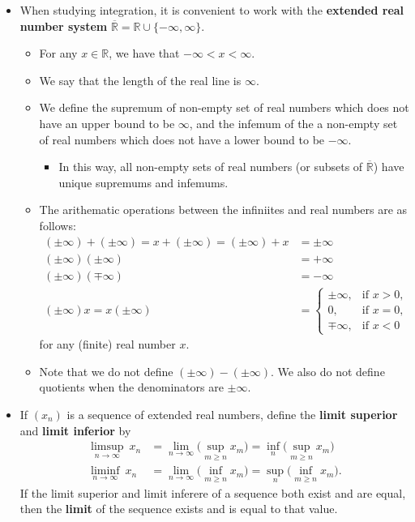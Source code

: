 \documentclass[10pt]{article}
\newcommand{\Real}{\mathbb{R}}
\begin{document}
\begin{itemize}
  \item When studying integration, it is convenient to work with the {\bf extended real number system} $\overline{\Real} = \Real \cup \{-\infty, \infty\}$.
  \begin{itemize}
    \item For any $x \in \Real$, we have that $-\infty < x < \infty$.
    \item We say that the length of the real line is $\infty$.
    \item We define the supremum of non-empty set of real numbers which does not have an upper bound to be $\infty$, and the infemum of the a non-empty set of real numbers which does not have a lower bound to be $-\infty$.
    \begin{itemize}
      \item In this way, all non-empty sets of real numbers (or subsets of $\overline{\Real}$) have unique supremums and infemums.
    \end{itemize}
    \item The arithematic operations between the infiniites and real numbers are as follows:
    \begin{align*}
        (\pm \infty) + (\pm \infty) = x + (\pm \infty) = (\pm \infty) + x &= \pm \infty \\
        (\pm \infty) (\pm \infty) &= +\infty \\
        (\pm \infty) (\mp \infty) &= -\infty \\        
        (\pm \infty) x = x (\pm \infty) &= \begin{cases}
            \pm \infty, & \mbox{if } x > 0, \\
            0, &\mbox{if } x = 0, \\
            \mp \infty, & \mbox{if } x < 0
        \end{cases}        
    \end{align*}
    for any (finite) real number $x$.
    \item Note that we do not define $(\pm \infty) - (\pm \infty)$. We also do not define quotients when the denominators are $\pm \infty$.  
  \end{itemize}
  
  \item If $(x_n)$ is a sequence of extended real numbers, define the {\bf limit superior} and {\bf limit inferior} by
  \begin{align*}
      \limsup_{n \rightarrow \infty}\ x_n &= \lim_{n \rightarrow \infty} \Big( \sup_{m \geq n} x_m \Big) = \inf_{n} \Big( \sup_{m \geq n} x_m \Big) \\
      \liminf_{n \rightarrow \infty}\ x_n &= \lim_{n \rightarrow \infty} \Big( \inf_{m \geq n} x_m \Big) = \sup_{n} \Big( \inf_{m \geq n} x_m \Big).
  \end{align*}
  If the limit superior and limit inferere of a sequence both exist and are equal, then the {\bf limit} of the sequence exists and is equal to that value.
\end{itemize}
\end{document}
